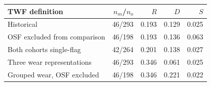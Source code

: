 \begin{tabular}{@{}lrrrr@{}}
\toprule
TWF definition & $n_m$/$n_o$ & $R$ & $D$ & $S$ \\
\midrule
Historical & 46/293 & 0.193 & 0.129 & 0.025 \\
OSF excluded from comparison & 46/198 & 0.193 & 0.136 & 0.063 \\
Both cohorts single-flag & 42/264 & 0.201 & 0.138 & 0.027 \\
Three wear representations & 46/293 & 0.346 & 0.061 & 0.025 \\
Grouped wear, OSF excluded & 46/198 & 0.346 & 0.221 & 0.022 \\
\bottomrule
\end{tabular}
